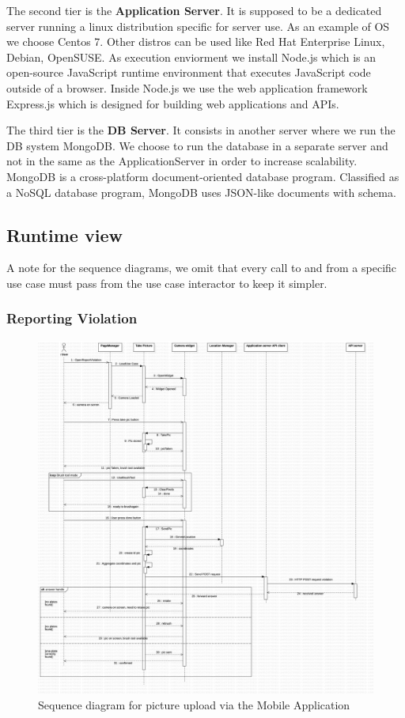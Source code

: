 The second tier is the \textbf{Application Server}. It is supposed to be a dedicated server running a linux distribution specific for server use. As an example of OS we choose Centos 7. Other distros can be used like Red Hat Enterprise Linux, Debian, OpenSUSE.
As execution enviorment we install Node.js which is an open-source JavaScript runtime environment that executes JavaScript code outside of a browser. Inside Node.js we use the web application framework Express.js which is designed for building web applications and APIs.


The third tier is the \textbf{DB Server}. It consists in another server where we run the DB system MongoDB. We choose to run the database in a separate server and not in the same as the ApplicationServer in order to increase scalability. MongoDB is a cross-platform document-oriented database program. Classified as a NoSQL database program, MongoDB uses JSON-like documents with schema.






\subsection{Runtime view}
A note for the sequence diagrams, we omit that every call to and from a specific use case must pass from the use case interactor to keep it simpler.

\subsubsection{Reporting Violation}
\begin{figure}[H]
\centering
\includegraphics[width=\textwidth]{Images/DDSequencePic.png}
\caption{\label{fig:sequencepic} Sequence diagram for picture upload via the Mobile Application}
\end{figure}

